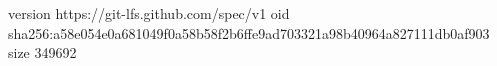 version https://git-lfs.github.com/spec/v1
oid sha256:a58e054e0a681049f0a58b58f2b6ffe9ad703321a98b40964a827111db0af903
size 349692
